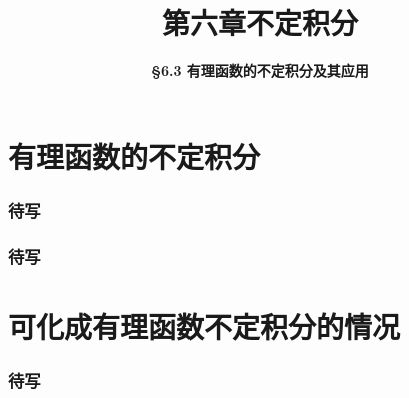 \everymath{\displaystyle}



\title[第六章\\
不定积分]{\texorpdfstring{\LARGE \bfseries 第六章\quad 不定积分}{第六章 不定积分}} %
\author[\smaller \S 6.3\\
有理函数的不定积分及其应用] %
{\Large \bfseries \S 6.3 有理函数的不定积分及其应用}
\date{}





\begin{frame}

\titlepage %

\end{frame}



\section{有理函数的不定积分}


\begin{frame}
\frametitle{待写}

\end{frame}


\begin{frame}
\frametitle{待写}

\end{frame}


\section{可化成有理函数不定积分的情况}


\begin{frame}
\frametitle{待写}

\end{frame}



